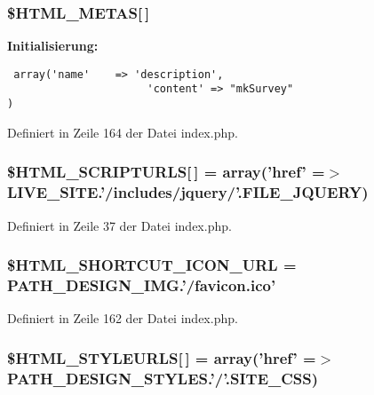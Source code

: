 \subsubsection{\setlength{\rightskip}{0pt plus 5cm}\$HTML\_\-METAS[$\,$]}\label{index_8php_5431d1deb1660c35c5a33d6787163104}


\textbf{Initialisierung:}

\begin{Code}\begin{verbatim} array('name'    => 'description',
                      'content' => "mkSurvey"
)
\end{verbatim}
\end{Code}


Definiert in Zeile 164 der Datei index.php.
\subsubsection{\setlength{\rightskip}{0pt plus 5cm}\$HTML\_\-SCRIPTURLS[$\,$] = array('href' =$>$ LIVE\_\-SITE.'/includes/jquery/'.{\bf FILE\_\-JQUERY})}\label{index_8php_1b89c42014a98b5cbfd77783a1de2ecc}




Definiert in Zeile 37 der Datei index.php.
\subsubsection{\setlength{\rightskip}{0pt plus 5cm}\$HTML\_\-SHORTCUT\_\-ICON\_\-URL = PATH\_\-DESIGN\_\-IMG.'/favicon.ico'}\label{index_8php_3b303c22384e5d686c1f3a8ab1ec5f24}




Definiert in Zeile 162 der Datei index.php.
\subsubsection{\setlength{\rightskip}{0pt plus 5cm}\$HTML\_\-STYLEURLS[$\,$] = array('href' =$>$ PATH\_\-DESIGN\_\-STYLES.'/'.{\bf SITE\_\-CSS})}\label{index_8php_9ebc3f13ab7c244131c88b01336ce47e}




